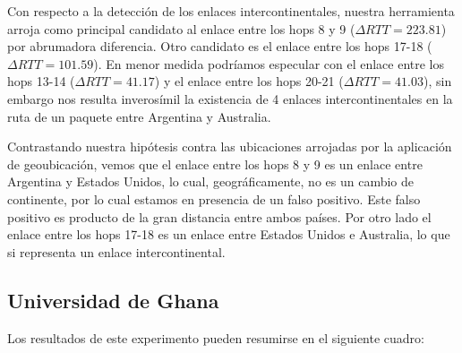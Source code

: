 Con respecto a la detección de los enlaces intercontinentales, nuestra herramienta arroja como principal candidato al enlace entre los hops 8 y 9 ($\Delta RTT = 223.81$) por abrumadora diferencia. Otro candidato es el enlace entre los hops 17-18 ($\Delta RTT = 101.59$). En menor medida podríamos especular con el enlace entre los hops 13-14 ($\Delta RTT = 41.17$) y el enlace entre los hops 20-21 ($\Delta RTT = 41.03$), sin embargo nos resulta inverosímil la existencia de 4 enlaces intercontinentales en la ruta de un paquete entre Argentina y Australia.

Contrastando nuestra hipótesis contra las ubicaciones arrojadas por la aplicación de geoubicación, vemos que el enlace entre los hops 8 y 9 es un enlace entre Argentina y Estados Unidos, lo cual, geográficamente, no es un cambio de continente, por lo cual estamos en presencia de un falso positivo. Este falso positivo es producto de la gran distancia entre ambos países. Por otro lado el enlace entre los hops 17-18 es un enlace entre Estados Unidos e Australia, lo que si representa un enlace intercontinental. 

\subsection{Universidad de Ghana}

Los resultados de este experimento pueden resumirse en el siguiente cuadro:

